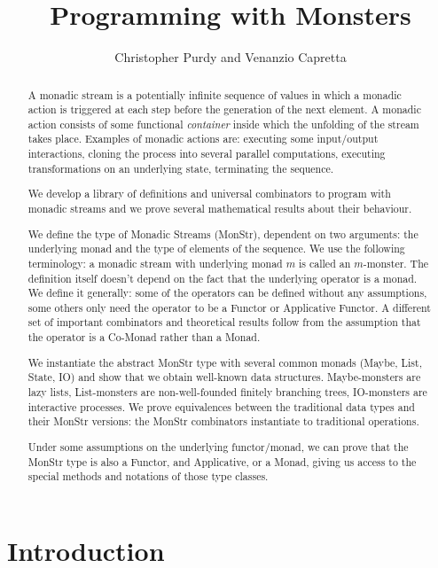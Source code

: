 \documentclass{article}
\title{Programming with Monsters}
\author{Christopher Purdy and Venanzio Capretta}
\begin{document}


\maketitle

\begin{abstract}
A monadic stream is a potentially infinite sequence of values in which a monadic action is triggered at each step before the generation of the next element.
A monadic action consists of some functional {\em container} inside which the unfolding of the stream takes place.
Examples of monadic actions are: executing some input/output interactions, cloning the process into several parallel computations, executing transformations on an underlying state, terminating the sequence.

We develop a library of definitions and universal combinators to program with monadic streams and we prove several mathematical results about their behaviour.

We define the type of Monadic Streams (MonStr), dependent on two arguments: the underlying monad and the type of elements of the sequence.
We use the following terminology: a monadic stream with underlying monad $m$ is called an $m$-monster.
The definition itself doesn't depend on the fact that the underlying operator is a monad.
We define it generally: some of the operators can be defined without any assumptions, some others only need the operator to be a Functor or Applicative Functor.
A different set of important combinators and theoretical results follow from the assumption that the operator is a Co-Monad rather than a Monad.

We instantiate the abstract MonStr type with several common monads (Maybe, List, State, IO) and show that we obtain well-known data structures.
Maybe-monsters are lazy lists, List-monsters are non-well-founded finitely branching trees, IO-monsters are interactive processes.
We prove equivalences between the traditional data types and their MonStr versions: the MonStr combinators instantiate to traditional operations.

Under some assumptions on the underlying functor/monad, we can prove that the MonStr type is also a Functor, and Applicative, or a Monad, giving us access to the special methods and notations of those type classes.
\end{abstract}

\section{Introduction}
\end{document}
